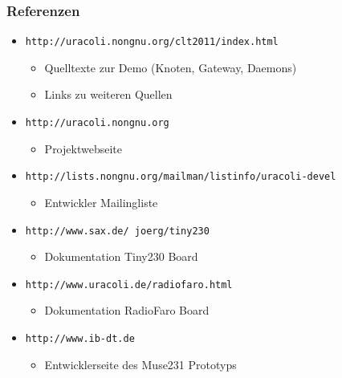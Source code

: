 \documentclass{beamer}
\begin{document}
\begin{frame}
\frametitle{Referenzen}

\begin{itemize}
\item \texttt{http://uracoli.nongnu.org/clt2011/index.html}
	\begin{itemize}
	\item Quelltexte zur Demo (Knoten, Gateway, Daemons)
	\item Links zu weiteren Quellen
	\end{itemize}

\item \texttt{http://uracoli.nongnu.org}
	\begin{itemize}
	\item Projektwebseite
	\end{itemize}

\item {\small\texttt{http://lists.nongnu.org/mailman/listinfo/uracoli-devel}}%
	\begin{itemize}
	\item Entwickler Mailingliste
	\end{itemize}

\item \texttt{http://www.sax.de/~joerg/tiny230}
	\begin{itemize}
	\item Dokumentation Tiny230 Board
	\end{itemize}

\item \texttt{http://www.uracoli.de/radiofaro.html}
	\begin{itemize}
	\item Dokumentation RadioFaro Board
	\end{itemize}

\item \texttt{http://www.ib-dt.de}
	\begin{itemize}
	\item Entwicklerseite des Muse231 Prototyps
	\end{itemize}
\end{itemize}

\end{frame}


\begin{frame}
\tableofcontents
\end{frame}
\end{document}
